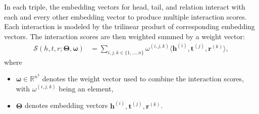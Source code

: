 \documentclass[sigconf,edbt]{acmart-edbt2019}
\def\vh{{\bm{h}}}
\def\vr{{\bm{r}}}
\def\vt{{\bm{t}}}
\def\gS{{\mathcal{S}}}
\def\sR{{\mathbb{R}}}
\begin{document}
In each triple, the embedding vectors for head, tail, and relation interact with each and every other embedding vector to produce multiple interaction scores. Each interaction is modeled by the trilinear product of corresponding embedding vectors. The interaction scores are then weighted summed by a weight vector:
\begin{equation} \label{eq:score}
\begin{split}
\gS (h,t,r;\bm{\Theta}, \bm{\omega}) &= \sum_{i, j, k \in \{1, ..., n\}} \omega^{(i,j,k)} \langle \vh^{(i)}, \vt^{(j)}, \vr^{(k)} \rangle,
\end{split}
\end{equation}
where 
\begin{itemize}
	\item $ \bm{\omega} \in \sR^{n^3} $ denotes the weight vector used to combine the interaction scores, with $ \omega^{(i,j,k)} $ being an element,
	\item $ \bm{\Theta} $ denotes embedding vectors $ \vh^{(i)}, \vt^{(j)}, \vr^{(k)} $.
\end{itemize}
\end{document}
